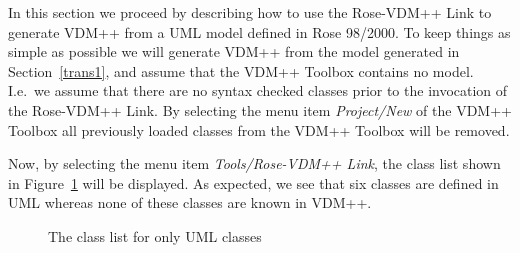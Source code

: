 \documentclass[\pformat,12pt]{article}
\newcommand{\vdmpp}{VDM++}
\newcommand{\link}{Rose-\vdmpp{} Link}
\newcommand{\rose}{Rose 98/2000}
\begin{document}
In this section we proceed by describing how to use the \link{} to
generate \vdmpp{} from a UML model defined in \rose{}.  To keep things
as simple as possible we will generate \vdmpp{} from the model
generated in Section~\ref{trans1}, and assume that the \vdmpp{}
Toolbox contains no model. I.e.\ we assume that there are no syntax
checked classes prior to the invocation of the \link{}. By selecting
the menu item {\it Project/New} of the \vdmpp{} Toolbox all previously
loaded classes from the \vdmpp{} Toolbox will be removed. 




Now, by selecting the menu item {\it Tools/\link{}}, the class list
shown in Figure~\ref{fig:UMLtoVDM} will be displayed. As expected, we
see that six classes are defined in UML whereas none of these classes
are known in \vdmpp{}.

\begin{figure}[htb]
\begin{center}
\mbox{}
\caption{The class list for only UML classes\label{fig:UMLtoVDM}}
\end{center}
\end{figure}
\end{document}
